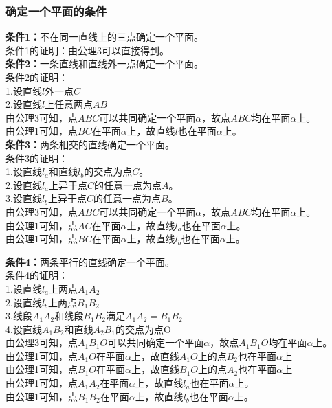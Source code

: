\documentclass[UTF8]{ctexart}
\begin{document}
\subsubsection{确定一个平面的条件}
    \textbf{条件1：}不在同一直线上的三点确定一个平面。\\[3mm]
    条件1的证明：由公理3可以直接得到。\\[8mm]
    \textbf{条件2：}一条直线和直线外一点确定一个平面。\\[3mm]
    条件2的证明：\\[3mm]
    1.设直线$l$外一点$C$\\[2mm]
    2.设直线$l$上任意两点$AB$\\[3mm]
    由公理3可知，点$ABC$可以共同确定一个平面$\alpha$，故点$ABC$均在平面$\alpha$上。\\[2mm]
    由公理1可知，点$BC$在平面$\alpha$上，故直线$l$也在平面$\alpha$上。\\[8mm]
    \textbf{条件3：}两条相交的直线确定一个平面。\\[3mm]
    条件3的证明：\\[3mm]
    1.设直线$l_a$和直线$l_b$的交点为点$C$。\\[2mm]
    2.设直线$l_a$上异于点$C$的任意一点为点$A$。\\[2mm]
    3.设直线$l_b$上异于点$C$的任意一点为点$B$。\\[3mm]
    由公理3可知，点$ABC$可以共同确定一个平面$\alpha$，故点$ABC$均在平面$\alpha$上。\\[2mm]
    由公理1可知，点$AC$在平面$\alpha$上，故直线$l_a$也在平面$\alpha$上。\\[2mm]
    由公理1可知，点$BC$在平面$\alpha$上，故直线$l_b$也在平面$\alpha$上。

\newpage

    \textbf{条件4：}两条平行的直线确定一个平面。\\[3mm]
    条件4的证明：\\[3mm]
    1.设直线$l_a$上两点$A_1A_2$\\[2mm]
    2.设直线$l_b$上两点$B_1B_2$\\[2mm]
    3.线段$A_1A_2$和线段$B_1B_2$满足$A_1A_2=B_1B_2$\\[2mm]
    4.设直线$A_1B_2$和直线$A_2B_1$的交点为点O\\[3mm]
    由公理3可知，点$A_1B_1O$可以共同确定一个平面$\alpha$，故点$A_1B_1O$均在平面$\alpha$上。\\[2mm]
    由公理1可知，点$A_1O$在平面$\alpha$上，故直线$A_1O$上的点$B_2$也在平面$\alpha$上\\[2mm]
    由公理1可知，点$B_1O$在平面$\alpha$上，故直线$B_1O$上的点$A_2$也在平面$\alpha$上\\[2mm]
    由公理1可知，点$A_1A_2$在平面$\alpha$上，故直线$l_a$也在平面$\alpha$上。\\[2mm]
    由公理1可知，点$B_1B_2$在平面$\alpha$上，故直线$l_b$也在平面$\alpha$上。
\end{document}
